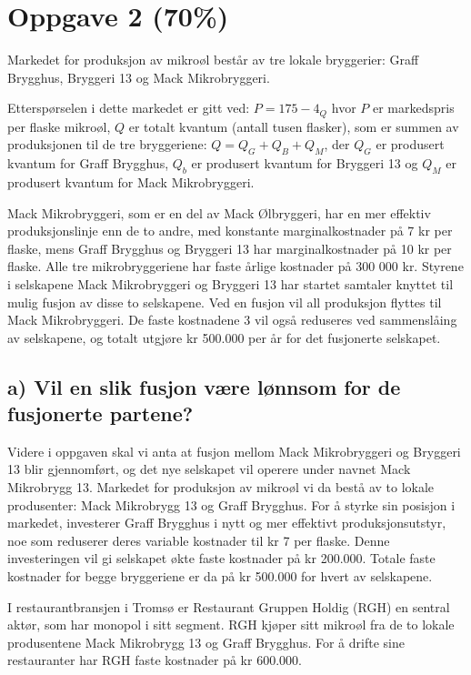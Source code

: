 \documentclass[
  12pt,
  a4paper,
  DIV=11,
  numbers=noendperiod]{scrartcl}
\begin{document}
\clearpage

\section{Oppgave 2 (70\%)}\label{oppgave-2-70}

Markedet for produksjon av mikroøl består av tre lokale bryggerier:
Graff Brygghus, Bryggeri 13 og Mack Mikrobryggeri.

Etterspørselen i dette markedet er gitt ved: \(P = 175 − 4_Q\) hvor
\(P\) er markedspris per flaske mikroøl, \(Q\) er totalt kvantum (antall
tusen flasker), som er summen av produksjonen til de tre bryggeriene:
\(Q = Q_G + Q_B + Q_M\), der \(Q_G\) er produsert kvantum for Graff
Brygghus, \(Q_b\) er produsert kvantum for Bryggeri 13 og \(Q_M\) er
produsert kvantum for Mack Mikrobryggeri.

Mack Mikrobryggeri, som er en del av Mack Ølbryggeri, har en mer
effektiv produksjonslinje enn de to andre, med konstante
marginalkostnader på 7 kr per flaske, mens Graff Brygghus og Bryggeri 13
har marginalkostnader på 10 kr per flaske. Alle tre mikrobryggeriene har
faste årlige kostnader på 300 000 kr. Styrene i selskapene Mack
Mikrobryggeri og Bryggeri 13 har startet samtaler knyttet til mulig
fusjon av disse to selskapene. Ved en fusjon vil all produksjon flyttes
til Mack Mikrobryggeri. De faste kostnadene 3 vil også reduseres ved
sammenslåing av selskapene, og totalt utgjøre kr 500.000 per år for det
fusjonerte selskapet.

\subsection{a) Vil en slik fusjon være lønnsom for de fusjonerte
partene?}\label{a-vil-en-slik-fusjon-vuxe6re-luxf8nnsom-for-de-fusjonerte-partene}

Videre i oppgaven skal vi anta at fusjon mellom Mack Mikrobryggeri og
Bryggeri 13 blir gjennomført, og det nye selskapet vil operere under
navnet Mack Mikrobrygg 13. Markedet for produksjon av mikroøl vi da
bestå av to lokale produsenter: Mack Mikrobrygg 13 og Graff Brygghus.
For å styrke sin posisjon i markedet, investerer Graff Brygghus i nytt
og mer effektivt produksjonsutstyr, noe som reduserer deres variable
kostnader til kr 7 per flaske. Denne investeringen vil gi selskapet økte
faste kostnader på kr 200.000. Totale faste kostnader for begge
bryggeriene er da på kr 500.000 for hvert av selskapene.

I restaurantbransjen i Tromsø er Restaurant Gruppen Holdig (RGH) en
sentral aktør, som har monopol i sitt segment. RGH kjøper sitt mikroøl
fra de to lokale produsentene Mack Mikrobrygg 13 og Graff Brygghus. For
å drifte sine restauranter har RGH faste kostnader på kr 600.000.
\end{document}
